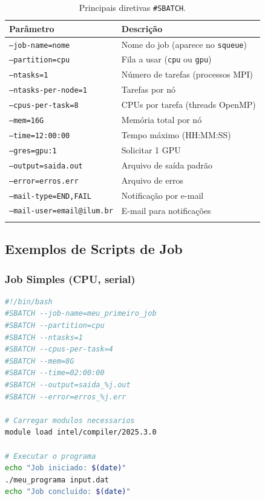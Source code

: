 \documentclass[11pt, a4paper]{article}
\newcommand{\cmd}[1]{\texttt{\textcolor{codeblue}{#1}}}
\begin{document}
\begin{longtable}{ll}
  \toprule
  \textbf{Parâmetro} & \textbf{Descrição} \\
  \midrule
  \endhead
  \texttt{--job-name=nome} & Nome do job (aparece no \cmd{squeue}) \\
  \texttt{--partition=cpu} & Fila a usar (\texttt{cpu} ou \texttt{gpu}) \\
  \texttt{--ntasks=1} & Número de tarefas (processos MPI) \\
  \texttt{--ntasks-per-node=1} & Tarefas por nó \\
  \texttt{--cpus-per-task=8} & CPUs por tarefa (threads OpenMP) \\
  \texttt{--mem=16G} & Memória total por nó \\
  \texttt{--time=12:00:00} & Tempo máximo (HH:MM:SS) \\
  \texttt{--gres=gpu:1} & Solicitar 1 GPU \\
  \texttt{--output=saida.out} & Arquivo de saída padrão \\
  \texttt{--error=erros.err} & Arquivo de erros \\
  \texttt{--mail-type=END,FAIL} & Notificação por e-mail \\
  \texttt{--mail-user=email@ilum.br} & E-mail para notificações \\
  \bottomrule
  \caption{Principais diretivas \texttt{\#SBATCH}.}
\end{longtable}

\subsection{Exemplos de Scripts de Job}

\subsubsection{Job Simples (CPU, serial)}

\begin{lstlisting}[style=script, language=bash]
#!/bin/bash
#SBATCH --job-name=meu_primeiro_job
#SBATCH --partition=cpu
#SBATCH --ntasks=1
#SBATCH --cpus-per-task=4
#SBATCH --mem=8G
#SBATCH --time=02:00:00
#SBATCH --output=saida_%j.out
#SBATCH --error=erros_%j.err

# Carregar modulos necessarios
module load intel/compiler/2025.3.0

# Executar o programa
echo "Job iniciado: $(date)"
./meu_programa input.dat
echo "Job concluido: $(date)"
\end{lstlisting}
\end{document}
